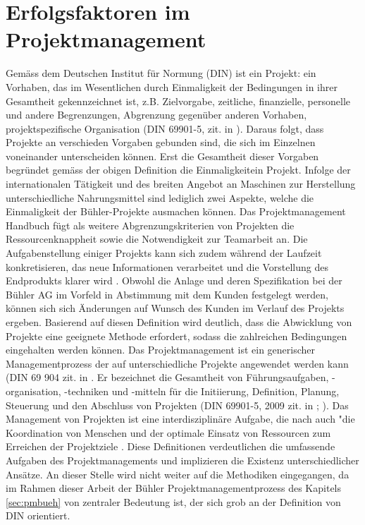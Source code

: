 \section{Erfolgsfaktoren im Projektmanagement} \label{sec:erfprj}	
Gemäss dem Deutschen Institut für Normung (DIN)  ist ein Projekt: \glqq ein Vorhaben, das im Wesentlichen durch Einmaligkeit der Bedingungen in ihrer Gesamtheit gekennzeichnet ist, z.B. Zielvorgabe, zeitliche, finanzielle, personelle und andere Begrenzungen, Abgrenzung gegenüber anderen Vorhaben, projektspezifische Organisation\grqq{ } (DIN 69901-5, zit. in \citealp*{alamg16}). Daraus folgt, dass Projekte an verschieden Vorgaben gebunden sind, die sich im Einzelnen voneinander unterscheiden können. Erst die Gesamtheit dieser Vorgaben begründet gemäss der obigen Definition die Einmaligkeitein Projekt. Infolge der internationalen Tätigkeit und des breiten Angebot an Maschinen zur Herstellung unterschiedliche Nahrungsmittel sind lediglich zwei Aspekte, welche die Einmaligkeit der Bühler-Projekte ausmachen können. Das Projektmanagement Handbuch \citeyear{pmhod} fügt als weitere Abgrenzungskriterien von Projekten die Ressourcenknappheit sowie die Notwendigkeit zur Teamarbeit an. Die Aufgabenstellung einiger Projekts kann sich zudem während der Laufzeit konkretisieren, das neue Informationen verarbeitet und die Vorstellung des Endprodukts klarer wird \citet[S.~1]{meyreh16}. Obwohl die Anlage und deren Spezifikation bei der Bühler AG im Vorfeld in Abstimmung mit dem Kunden festgelegt werden, können sich  sich Änderungen auf Wunsch des Kunden im Verlauf des Projekts ergeben. Basierend auf diesen Definition wird deutlich, dass die Abwicklung von Projekte eine geeignete Methode erfordert, sodass die zahlreichen Bedingungen eingehalten werden können. Das Projektmanagement ist ein \glqq generischer Managementprozess \grqq{ } der auf unterschiedliche Projekte angewendet werden kann (DIN 69 904 zit. in \citealp*{pmhod}. Er bezeichnet die \glqq Gesamtheit von Führungsaufgaben, -organisation, -techniken und -mitteln für die Initiierung, Definition, Planung, Steuerung und den Abschluss von Projekten\grqq{ } (DIN 69901-5, 2009 zit. in \citealp*[S.~3]{meyreh16}; \citet{pmhod}). Das Management von Projekten ist eine interdisziplinäre Aufgabe, die nach \citet[S.~2]{alamg16} auch "die Koordination von Menschen und der optimale Einsatz von Ressourcen zum Erreichen der Projektziele \grqq { }. Diese Definitionen verdeutlichen die umfassende Aufgaben des Projektmanagements und implizieren die Existenz unterschiedlicher Ansätze. An dieser Stelle wird nicht weiter auf die Methodiken eingegangen, da im Rahmen dieser Arbeit der Bühler Projektmanagementprozess des Kapitels \ref{sec:pmbueh} von zentraler Bedeutung ist, der sich grob an der Definition von DIN orientiert.
